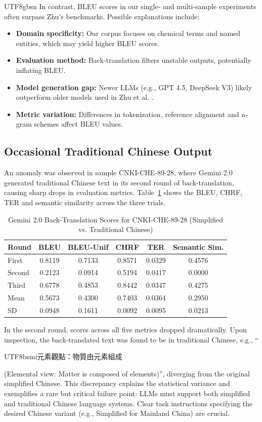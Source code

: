 \documentclass[conference]{IEEEtran}
\begin{document}
\begin{CJK}{UTF8}{gbsn}
In contrast, BLEU scores in our single- and multi-sample experiments often surpass Zhu’s benchmarks. Possible explanations include:
\begin{itemize}
  \item \textbf{Domain specificity:} Our corpus focuses on chemical terms and named entities, which may yield higher BLEU scores.
  \item \textbf{Evaluation method:} Back-translation filters unstable outputs, potentially inflating BLEU.
  \item \textbf{Model generation gap:} Newer LLMs (e.g., GPT 4.5, DeepSeek V3) likely outperform older models used in Zhu et al. \citep{zhu2025overcoming}.
  \item \textbf{Metric variation:} Differences in tokenization, reference alignment and n-gram schemes affect BLEU values.
\end{itemize}

\subsection{Occasional Traditional Chinese Output}

An anomaly was observed in sample CNKI-CHE-89-28, where Gemini 2.0 generated traditional Chinese text in its second round of back-translation, causing sharp drops in evaluation metrics. Table~\ref{tab:gemini_tradition} shows the BLEU, CHRF, TER and semantic similarity across the three trials.

\begin{table}[htbp]
\centering
\caption{Gemini 2.0 Back-Translation Scores for CNKI-CHE-89-28 (Simplified vs. Traditional Chinese)}
\label{tab:gemini_tradition}
\begin{tabular}{l|c|c|c|c|c}
\hline
\textbf{Round} & BLEU & BLEU-Unif & CHRF & TER & Semantic Sim. \\
\hline
First  & 0.8119 & 0.7133 & 0.8571 & 0.0329 & 0.4576 \\
Second & 0.2123 & 0.0914 & 0.5194 & 0.0417 & 0.0000 \\
Third  & 0.6778 & 0.4853 & 0.8442 & 0.0347 & 0.4275 \\
\hline
Mean   & 0.5673 & 0.4300 & 0.7403 & 0.0364 & 0.2950 \\
SD     & 0.0948 & 0.1611 & 0.0092 & 0.0095 & 0.0213 \\
\hline
\end{tabular}
\end{table}

In the second round, scores across all five metrics dropped dramatically. Upon inspection, the back-translated text was found to be in traditional Chinese, e.g., ``\begin{CJK}{UTF8}{bsmi}元素觀點：物質由元素組成\end{CJK} (Elemental view: Matter is composed of elements)'', diverging from the original simplified Chinese. This discrepancy explains the statistical variance and exemplifies a rare but critical failure point: LLMs must support both simplified and traditional Chinese language systems. Clear task instructions specifying the desired Chinese variant (e.g., Simplified for Mainland China) are crucial.


\end{CJK}
\end{document}
